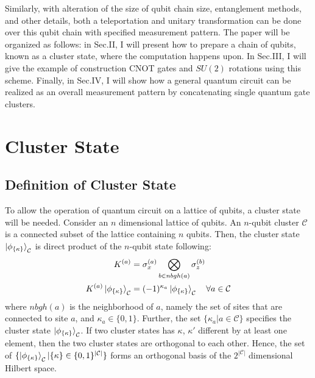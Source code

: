 \documentclass[twocolumn,secnumarabic,amssymb, nobibnotes, aps, prd]{revtex4-2}
\begin{document}
Similarly, with alteration of the size of qubit chain size, entanglement methods, and other details, both a teleportation and unitary transformation can be done over this qubit chain with specified measurement pattern. The paper will be organized as follows: in Sec.II, I will present how to prepare a chain of qubits, known as a cluster state, where the computation happens upon. In Sec.III, I will give the example of construction CNOT gates and $SU(2)$ rotations using this scheme. Finally, in Sec.IV, I will show how a general quantum circuit can be realized as an overall measurement pattern by concatenating single quantum gate clusters.\par

\section{Cluster State}\label{cluster state}
\subsection{Definition of Cluster State}
To allow the operation of quantum circuit on a lattice of qubits, a cluster state will be needed. Consider an $n$ dimensional lattice of qubits. An $n$-qubit cluster $\mathcal{C}$ is a connected subset of the lattice containing $n$ qubits. Then, the cluster state $\ket{\phi_{\{\kappa\}}}_{\mathcal{C}}$ is direct product of the $n$-qubit state following:
\begin{align}
    K^{(a)} &= \sigma_x^{(a)} \bigotimes_{b \in nbgh(a)} \sigma_z^{(b)} \notag\\
    K^{(a)}\ket{\phi_{\{\kappa\}}}_{\mathcal{C}} &= (-1)^{\kappa_a}\ket{\phi_{\{\kappa\}}}_{\mathcal{C}} \quad \forall a \in \mathcal{C}
\end{align}
where $nbgh(a)$ is the neighborhood of $a$, namely the set of sites that are connected to site $a$, and $\kappa_{a} \in \{0, 1\}$. Further, the set $\{\kappa_a| a \in \mathcal{C}\}$ specifies the cluster state $\ket{\phi_{\{\kappa\}}}_{\mathcal{C}}$. If two cluster states has ${\kappa}$, ${\kappa'}$ different by at least one element, then the two cluster states are orthogonal to each other. Hence, the set of $\{\ket{\phi_{\{\kappa\}}}_{\mathcal{C}} \vert \{\kappa\} \in \{ 0, 1\}^{|\mathcal{C}|} \}$ forms an orthogonal basis of the $2^{|\mathcal{C}|}$ dimensional Hilbert space.\par
\end{document}
